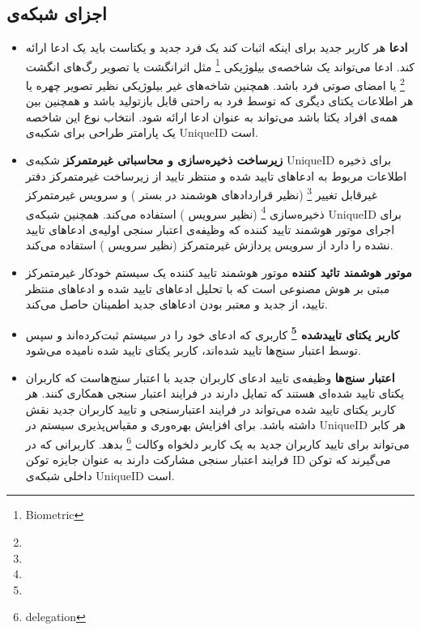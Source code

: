\documentclass{article}
\begin{document}
\subsection*{اجزای شبکه‌ی }
\begin{itemize}
\item \textbf{ادعا}
هر کاربر جدید برای اینکه اثبات کند یک فرد جدید و یکتاست باید یک ادعا ارائه کند. ادعا می‌تواند یک شاخصه‌ی بیلوژیکی \footnote{Biometric} مثل اثرانگشت یا تصویر رگ‌های انگشت
 \footnote{} یا امضای صوتی فرد باشد. همچنین شاخه‌‌های غیر بیلوژیکی نظیر تصویر چهره یا هر اطلاعات یکتای دیگری که توسط فرد به راحتی قابل بازتولید باشد و همچنین بین همه‌ی افراد یکتا باشد می‌تواند به عنوان ادعا ارائه شود. انتخاب نوع این شاخصه یک پارامتر طراحی برای شکبه‌ی UniqueID است.

\item \textbf{زیرساخت ذخیره‌سازی و محاسباتی غیرمتمرکز} 
شکبه‌ی UniqueID برای ذخیره اطلاعات مربوط به ادعا‌های تایید شده و منتظر تایید از زیرساخت غیرمتمرکز دفتر غیرقابل تغییر \footnote{} (نظیر قراردادهای هوشمند در بستر ) و سرویس غیرمتمرکز ذخیره‌سازی
\footnote{}
  (نظیر سرویس ) استفاده می‌کند. همچنین شبکه‌ی UniqueID برای اجرای موتور هوشمند تایید کننده که وظیفه‌ی اعتبار سنجی اولیه‌ی ادعاهای تایید نشده را دارد از سرویس پردازش غیرمتمرکز (نظیر سرویس ) استفاده می‌کند.
\item \textbf{موتور هوشمند تائید کننده} 
موتور هوشمند تایید کننده یک سیستم خودکار غیرمتمرکز مبتی بر هوش مصنوعی است که با تحلیل ادعاهای تایید شده و ادعاهای منتظر تایید، از جدید و معتبر بودن ادعاهای جدید اطمینان حاصل می‌کند.

\item \textbf{کاربر یکتای تایید‌شده \footnote{}}
کاربری که ادعای خود را در سیستم ثبت‌کرده‌اند و سپس توسط اعتبار سنج‌ها تایید شده‌اند، کاربر یکتای تایید شده نامیده می‌شود.

\item \textbf{اعتبار سنج‌ها} 
وظیفه‌ی تایید ادعای کاربران جدید با اعتبار سنج‌هاست که کاربران یکتای تایید شده‌ای هستند که تمایل دارند در فرایند اعتبار سنجی همکاری کنند. هر کاربر یکتای تایید شده می‌تواند در فرایند اعتبارسنجی و تایید کاربران جدید نقش داشته باشد. برای افزایش بهره‌وری و مقیاس‌پذیری سیستم در UniqueID هر کابر می‌تواند برای تایید کاربران جدید به یک کاربر دلخواه وکالت 
\footnote{delegation}
بدهد. کاربرانی که در فرایند اعتبار سنجی مشارکت دارند به عنوان جایزه توکن ID می‌گیرند که توکن داخلی شبکه‌ی UniqueID است.


\end{itemize}
\end{document}
